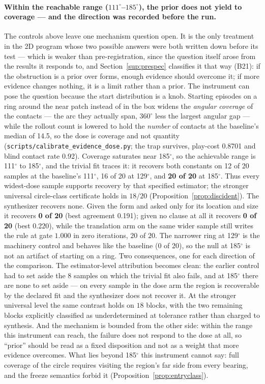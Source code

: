 \documentclass[11pt]{article}
\theoremstyle{definition}
\theoremstyle{remark}
\begin{document}
\paragraph{Within the reachable range ($111^\circ$--$185^\circ$), the prior does not yield to coverage --- and the direction was recorded before the run.} The controls above leave one mechanism question open. It is the only treatment in the 2D program whose two possible answers were both written down before its test --- which is weaker than pre-registration, since the question itself arose from the results it responds to, and Section~\ref{sup:prespec} classifies it that way (B21): if the obstruction is a prior over forms, enough evidence should overcome it; if more evidence changes nothing, it is a limit rather than a prior. The instrument can pose the question because the start distribution is a knob. Starting episodes on a ring around the near patch instead of in the box widens the \emph{angular coverage} of the contacts --- the arc they actually span, $360^\circ$ less the largest angular gap --- while the rollout count is lowered to hold the \emph{number} of contacts at the baseline's median of 14.5, so the dose is coverage and not quantity (\texttt{scripts/\allowbreak calibrate\_\allowbreak evidence\_\allowbreak dose.py}; the trap survives, play-cost 0.8701 and blind contact rate 0.92). Coverage saturates near 185$^\circ$, so the achievable range is 111$^\circ$ to 185$^\circ$, and the trivial fit traces it: it recovers both constants on 12 of 20 samples at the baseline's 111$^\circ$, 16 of 20 at 129$^\circ$, and \textbf{20 of 20} at 185$^\circ$. Thus every widest-dose sample supports recovery by that specified estimator; the stronger universal circle-class certificate holds in $18/20$ (Proposition~\ref{prop:discident}). The synthesizer recovers none. Given the form and asked only for its location and size it recovers \textbf{0 of 20} (best agreement 0.191); given no clause at all it recovers \textbf{0 of 20} (best 0.220), while the translation arm on the same wider sample still writes the rule at gate $1.000$ in zero iterations, $20$ of $20$. The narrower ring at 129$^\circ$ is the machinery control and behaves like the baseline (0 of 20), so the null at 185$^\circ$ is not an artifact of starting on a ring. Two consequences, one for each direction of the comparison. The estimator-level attribution becomes clean: the earlier control had to set aside the 8 samples on which the trivial fit also fails, and at 185$^\circ$ there are none to set aside --- on every sample in the dose arm the region is recoverable by the declared fit and the synthesizer does not recover it. At the stronger universal level the same contrast holds on $18$ blocks, with the two remaining blocks explicitly classified as underdetermined at tolerance rather than charged to synthesis. And the mechanism is bounded from the other side: within the range this instrument can reach, the failure does not respond to the dose at all, so ``prior'' should be read as a fixed disposition and not as a weight that more evidence overcomes. What lies beyond 185$^\circ$ this instrument cannot say: full coverage of the circle requires visiting the region's far side from every bearing, and the freeze semantics forbid it (Proposition~\ref{prop:entryclass}).
\end{document}

